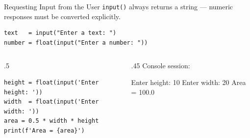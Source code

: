 \documentclass[9pt,aspectratio=169,xcolor=table]{beamer}
\begin{document}
\begin{frame}[fragile]{Requesting Input from the User}
    \leavevmode
    \texttt{input()} always returns a \alert{string} --- numeric
    responses must be converted explicitly.

\begin{lstlisting}
text   = input("Enter a text: ")
number = float(input("Enter a number: "))
\end{lstlisting}

    \vspace{2mm}
    \begin{columns}[t]
        \begin{column}{.5\textwidth}
\begin{lstlisting}
height = float(input('Enter height: '))
width  = float(input('Enter width: '))
area = 0.5 * width * height
print(f'Area = {area}')
\end{lstlisting}
        \end{column}
        \begin{column}{.45\textwidth}
            \small Console session:
\begin{pyout}
Enter height: 10
Enter width: 20
Area = 100.0
\end{pyout}
        \end{column}
    \end{columns}
\end{frame}
\end{document}
